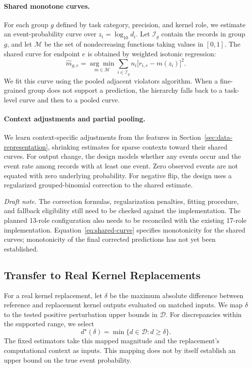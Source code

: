 \documentclass{article}
\begin{document}
\paragraph{Shared monotone curves.}
For each group $g$ defined by task category, precision, and kernel role, we estimate an event-probability curve over $z_i=\log_{10}d_i$.
Let $\mathcal{I}_g$ contain the records in group $g$, and let $\mathcal{M}$ be the set of nondecreasing functions taking values in $[0,1]$.
The shared curve for endpoint $e$ is obtained by weighted isotonic regression:
\begin{equation}
\widehat m_{g,e}
=\underset{m\in\mathcal{M}}{\arg\min}
\sum_{i\in\mathcal{I}_g}n_i\bigl[r_{i,e}-m(z_i)\bigr]^2.
\label{eq:shared-curve}
\end{equation}
We fit this curve using the pooled adjacent violators algorithm.
When a fine-grained group does not support a prediction, the hierarchy falls back to a task-level curve and then to a pooled curve.

\paragraph{Context adjustments and partial pooling.}
We learn context-specific adjustments from the features in Section~\ref{sec:data-representation}, shrinking estimates for sparse contexts toward their shared curves.
For output change, the design models whether any events occur and the event rate among records with at least one event.
Zero observed events are not equated with zero underlying probability.
For negative flip, the design uses a regularized grouped-binomial correction to the shared estimate.

\smallskip
{\small\noindent\textit{Draft note.}
The correction formulas, regularization penalties, fitting procedure, and fallback eligibility still need to be checked against the implementation.
The planned 13-role configuration also needs to be reconciled with the existing 17-role implementation.
Equation~\ref{eq:shared-curve} specifies monotonicity for the shared curves; monotonicity of the final corrected predictions has not yet been established.\par}

\subsection{Transfer to Real Kernel Replacements}
\label{sec:replacement-transfer}

For a real kernel replacement, let $\delta$ be the maximum absolute difference between reference and replacement kernel outputs evaluated on matched inputs.
We map $\delta$ to the tested positive perturbation upper bounds in $\mathcal{D}$.
For discrepancies within the supported range, we select
\begin{equation}
d^\star(\delta)=\min\{d\in\mathcal{D}:d\geq\delta\}.
\label{eq:dose-mapping}
\end{equation}
The fixed estimators take this mapped magnitude and the replacement's computational context as inputs.
This mapping does not by itself establish an upper bound on the true event probability.
\end{document}
